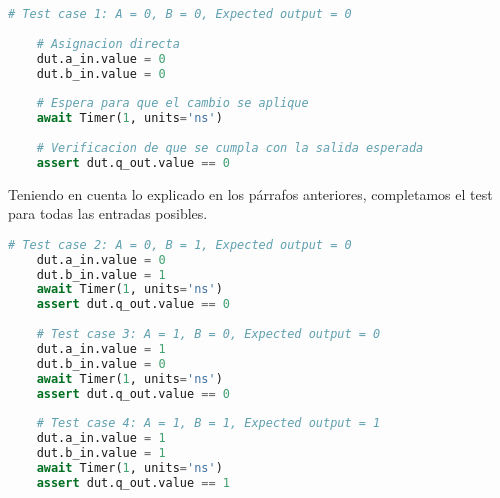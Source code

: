 \documentclass[a4paper,12pt]{article}
\begin{document}
\begin{lstlisting}[language=Python, caption=and\_tb.py, frame=lines]
	# Test case 1: A = 0, B = 0, Expected output = 0
	
	# Asignacion directa
	dut.a_in.value = 0
	dut.b_in.value = 0
	
	# Espera para que el cambio se aplique
	await Timer(1, units='ns')
	
	# Verificacion de que se cumpla con la salida esperada
	assert dut.q_out.value == 0
\end{lstlisting}

Teniendo en cuenta lo explicado en los párrafos anteriores, completamos el test para todas las entradas posibles.

\begin{lstlisting}[language=Python, caption=and\_tb.py, frame=lines]
	# Test case 2: A = 0, B = 1, Expected output = 0
	dut.a_in.value = 0
	dut.b_in.value = 1
	await Timer(1, units='ns')
	assert dut.q_out.value == 0
	
	# Test case 3: A = 1, B = 0, Expected output = 0
	dut.a_in.value = 1
	dut.b_in.value = 0
	await Timer(1, units='ns')
	assert dut.q_out.value == 0
	
	# Test case 4: A = 1, B = 1, Expected output = 1
	dut.a_in.value = 1
	dut.b_in.value = 1
	await Timer(1, units='ns')
	assert dut.q_out.value == 1
\end{lstlisting}
\end{document}
